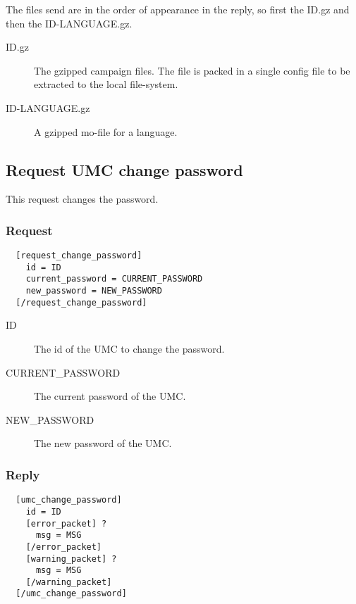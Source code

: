 The files send are in the order of appearance in the reply, so first the ID.gz and then
the ID-LANGUAGE.gz.
\begin{description}
\item[ID.gz]
	The gzipped campaign files. The file is packed in a single config file
	to be extracted to the local file-system.

\item[ID-LANGUAGE.gz]
	A gzipped mo-file for a language.

\end{description}


\subsection{Request UMC change password}
\label{wire:request_umc_change_password}

This request changes the password.

\subsubsection{Request}
\begin{lstlisting}
  [request_change_password]
    id = ID
    current_password = CURRENT_PASSWORD
    new_password = NEW_PASSWORD
  [/request_change_password]
\end{lstlisting}

\begin{description}
\item[ID]
  The id of the UMC to change the password.

\item[CURRENT\_PASSWORD]
  The current password of the UMC.

\item[NEW\_PASSWORD]
  The new password of the UMC.
\end{description}

\subsubsection{Reply}
\begin{lstlisting}
  [umc_change_password]
    id = ID
    [error_packet] ?
      msg = MSG
    [/error_packet]
    [warning_packet] ?
      msg = MSG
    [/warning_packet]
  [/umc_change_password]
\end{lstlisting}

